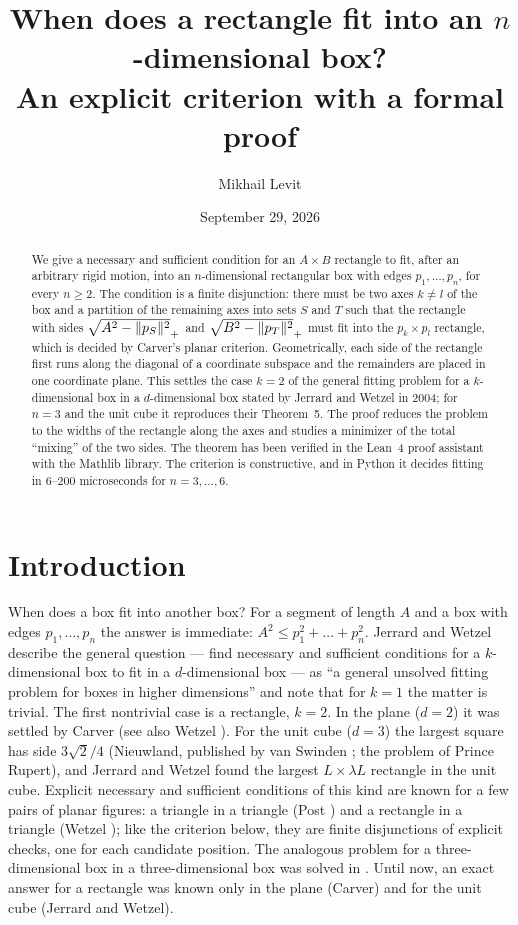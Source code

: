 \documentclass[11pt]{article}
\title{When does a rectangle fit into an $n$-dimensional box?\\ An explicit criterion with a formal proof}
\author{Mikhail Levit}
\date{September 29, 2026}
\theoremstyle{definition}
\theoremstyle{remark}
\DeclarePairedDelimiter{\norm}{\lVert}{\rVert}
\begin{document}
\maketitle

\begin{abstract}
We give a necessary and sufficient condition for an $A\times B$ rectangle to fit, after an arbitrary
rigid motion, into an $n$-dimensional rectangular box with edges $p_1,\dots,p_n$, for every $n\ge2$.
The condition is a finite disjunction: there must be two axes $k\ne l$ of the box and a partition of the
remaining axes into sets $S$ and $T$ such that the rectangle with sides $\sqrt{A^2-\norm{p_S}^2}_+$ and
$\sqrt{B^2-\norm{p_T}^2}_+$ must fit into the $p_k\times p_l$ rectangle, which is decided by Carver's
planar criterion. Geometrically, each side of the rectangle first runs along the diagonal of a
coordinate subspace and the remainders are placed in one coordinate plane. This settles the case
$k=2$ of the general fitting problem for a $k$-dimensional box in a $d$-dimensional box stated by
Jerrard and Wetzel in 2004; for $n=3$ and the unit cube it reproduces their Theorem~5. The proof reduces
the problem to the widths of the rectangle along the axes and studies a minimizer of the total
``mixing'' of the two sides. The theorem has been verified in the Lean~4 proof assistant with the
Mathlib library. The criterion is constructive, and in Python it decides fitting in $6$--$200$
microseconds for $n=3,\dots,6$.
\end{abstract}

\section{Introduction}

When does a box fit into another box? For a segment of length $A$ and a box with edges
$p_1,\dots,p_n$ the answer is immediate: $A^2\le p_1^2+\dots+p_n^2$. Jerrard and Wetzel
\cite[p.~22]{JerrardWetzel2004} describe the general question --- find necessary and sufficient
conditions for a $k$-dimensional box to fit in a $d$-dimensional box --- as ``a general unsolved
fitting problem for boxes in higher dimensions'' and note that for $k=1$ the matter is trivial.
The first nontrivial case is a rectangle, $k=2$. In the plane ($d=2$) it was settled by Carver
\cite{Carver1957} (see also Wetzel \cite{Wetzel2000}). For the unit cube ($d=3$) the largest square
has side $3\sqrt2/4$ (Nieuwland, published by van Swinden \cite{vanSwinden1816}; the problem of Prince
Rupert), and Jerrard and Wetzel \cite[Theorem~5]{JerrardWetzel2004} found the largest
$L\times\lambda L$ rectangle in the unit cube. Explicit necessary and sufficient conditions of this kind
are known for a few pairs of planar figures: a triangle in a triangle (Post \cite{Post1993}) and a rectangle
in a triangle (Wetzel \cite{Wetzel2004}); like the criterion below, they are finite disjunctions of explicit
checks, one for each candidate position. The analogous problem for a three-dimensional box in a
three-dimensional box was solved in \cite{Levit2026}. Until now, an exact answer for a rectangle was known
only in the plane (Carver) and for the unit cube (Jerrard and Wetzel).
\end{document}
